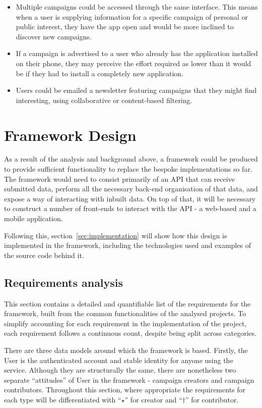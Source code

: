 \documentclass{article}
\newcommand\ssection{\clearpage\section}
\begin{document}
\begin{enumerate}
			\begin{itemize}
				\item Multiple campaigns could be accessed through the same interface. This means when a user is supplying information for a specific campaign of personal or public interest, they have the app open and would be more inclined to discover new campaigns.
				\item If a campaign is advertised to a user who already has the application installed on their phone, they may perceive the effort required as lower than it would be if they had to install a completely new application.
				\item Users could be emailed a newsletter featuring campaigns that they might find interesting, using collaborative or content-based filtering.
			\end{itemize}
		\end{enumerate}

	\ssection{Framework Design}
	\label{sec:architecture}
		As a result of the analysis and background above, a framework could be produced to provide sufficient functionality to replace the bespoke implementations so far. The framework would need to consist primarily of an API that can receive submitted data, perform all the necessary back-end organisation of that data, and expose a way of interacting with inbuilt data. On top of that, it will be necessary to construct a number of front-ends to interact with the API - a web-based and a mobile application.

		Following this, section~\ref{sec:implementation} will show how this design is implemented in the framework, including the technologies used and examples of the source code behind it.

		\subsection{Requirements analysis}

		This section contains a detailed and quantifiable list of the requirements for the framework, built from the common functionalities of the analysed projects. To simplify accounting for each requirement in the implementation of the project, each requirement follows a continuous count, despite being split across categories.

		There are three data models around which the framework is based. Firstly, the User is the authenticated account and stable identity for anyone using the service. Although they are structurally the same, there are nonetheless two separate ``attitudes'' of User in the framework - campaign creators and campaign contributors. Throughout this section, where appropriate the requirements for each type will be differentiated with ``$\star$'' for creator and ``$\dagger$'' for contributor.
\end{document}
